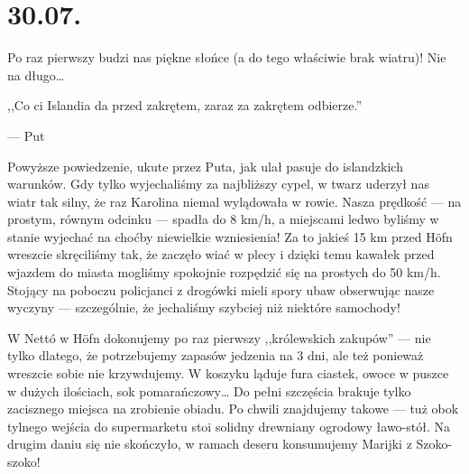 \chapter*{30.07.}

Po raz pierwszy budzi nas piękne słońce (a do tego właściwie brak wiatru)! Nie na długo…

\epigraph{,,Co ci Islandia da przed zakrętem, zaraz za zakrętem odbierze.''}{--- \textup{Put}}

Powyższe powiedzenie, ukute przez Puta, jak ulał pasuje do islandzkich warunków. Gdy tylko wyjechaliśmy za najbliższy cypel, w twarz uderzył nas wiatr tak silny, że raz Karolina niemal wylądowała w rowie. Nasza prędkość --- na prostym, równym odcinku --- spadła do 8 km/h, a miejscami ledwo byliśmy w stanie wyjechać na choćby niewielkie wzniesienia! Za to jakieś 15 km przed Höfn wreszcie skręciliśmy tak, że zaczęło wiać w plecy i dzięki temu kawałek przed wjazdem do miasta mogliśmy spokojnie rozpędzić się na prostych do 50 km/h. Stojący na poboczu policjanci z drogówki mieli spory ubaw obserwując nasze wyczyny --- szczególnie, że jechaliśmy szybciej niż niektóre samochody!



W Nettó w Höfn dokonujemy po raz pierwszy ,,królewskich zakupów'' --- nie tylko dlatego, że potrzebujemy zapasów jedzenia na 3 dni, ale też ponieważ wreszcie sobie nie krzywdujemy. W koszyku ląduje fura ciastek, owoce w puszce w dużych ilościach, sok pomarańczowy… Do pełni szczęścia brakuje tylko zacisznego miejsca na zrobienie obiadu. Po chwili znajdujemy takowe --- tuż obok tylnego wejścia do supermarketu stoi solidny drewniany ogrodowy ławo-stół. Na drugim daniu się nie skończyło, w ramach deseru konsumujemy Marijki z Szoko-szoko!


